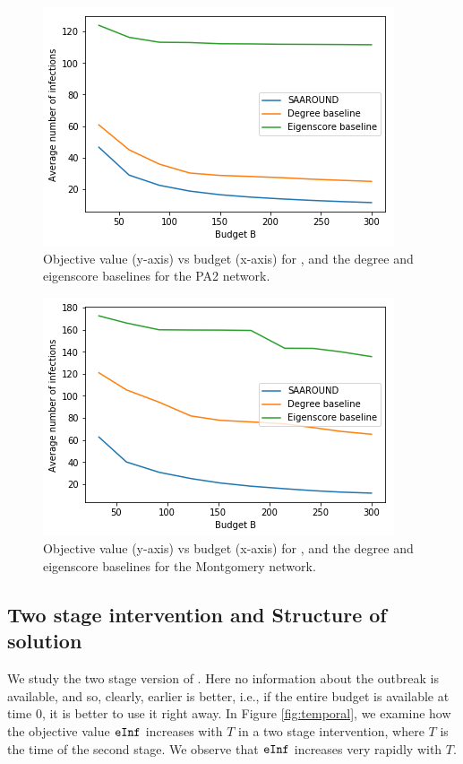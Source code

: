 \begin{figure}[!h]
    \centering
    \includegraphics[scale = 0.55]{Figuresnew/pa2_obj.png}
    \caption{Objective value (y-axis) vs budget (x-axis) for \algo{}, and the degree and eigenscore baselines for the PA2 network.}
    \label{fig:pa2approx}
\end{figure}

\begin{figure}[!h]
    \centering
    \includegraphics[scale = 0.55]{Figuresnew/mont_obj.png}
    \caption{Objective value (y-axis) vs budget (x-axis) for \algo{}, and the degree and eigenscore baselines for the Montgomery network.}
    \label{fig:mont-approx}
\end{figure}

\subsection{Two stage intervention and Structure of solution}
We study the two stage version of \prob{}. Here no information about the outbreak is available, and so, clearly, earlier is better, i.e., if the entire budget is available at time $0$, it is better to use it right away. In Figure \ref{fig:temporal}, we examine how the objective value $\texttt{eInf}{}$ increases with $T$ in a two stage intervention, where $T$ is the time of the second stage. We observe that $\texttt{eInf}{}$ increases very rapidly with $T$.

